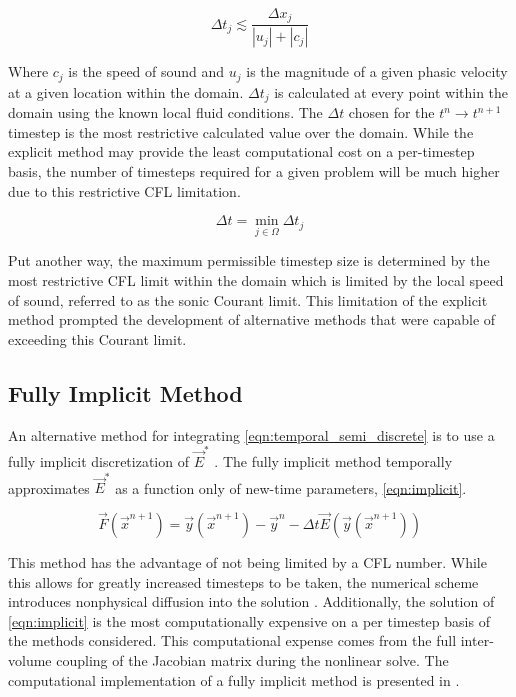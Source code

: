 \begin{equation}
\label{eqn:cfl_explicit}
\Delta t_j \lesssim \frac{\Delta x_j}{|u_j|+|c_j|}
\end{equation}

Where $c_j$ is the speed of sound and $u_j$ is the magnitude of a given phasic velocity at a given location within the domain.
$\Delta t_j$ is calculated at every point within the domain using the known local fluid conditions.
The $\Delta t$ chosen for the $t^{n} \rightarrow t^{n+1}$ timestep is the most restrictive calculated value over the domain.
While the explicit method may provide the least computational cost on a per-timestep basis, the number of timesteps required for a given problem will be much higher due to this restrictive CFL limitation.

\begin{equation}
\label{eqn:global_cfl}
\Delta t = \min_{j \in \Omega} \Delta t_j
\end{equation}

Put another way, the maximum permissible timestep size is determined by the most restrictive CFL limit within the domain which is limited by the local speed of sound, referred to as the sonic Courant limit.
This limitation of the explicit method prompted the development of alternative methods that were capable of exceeding this Courant limit.

\subsection{Fully Implicit Method}
\label{subsect:numerics_fully_implicit}
An alternative method for integrating \eqref{eqn:temporal_semi_discrete} is to use a fully implicit discretization of $\vec{E}^{*}$ \cite{Frepoli2003, Barre1990}.
The fully implicit method temporally approximates $\vec{E}^{*}$ as a function only of new-time parameters, \eqref{eqn:implicit}.

\begin{equation}
\label{eqn:implicit}
\vec{F}(\vec{x}^{n+1}) = \vec{y}(\vec{x}^{n+1}) - \vec{y}^{n} - \Delta t \vec{E}(\vec{y}(\vec{x}^{n+1}))
\end{equation}

This method has the advantage of not being limited by a CFL number.
While this allows for greatly increased timesteps to be taken, the numerical scheme introduces nonphysical diffusion into the solution \cite{Mahaffy1993}.
Additionally, the solution of \eqref{eqn:implicit} is the most computationally expensive on a per timestep basis of the methods considered.
This computational expense comes from the full inter-volume coupling of the Jacobian matrix during the nonlinear solve.
The computational implementation of a fully implicit method is presented in .

